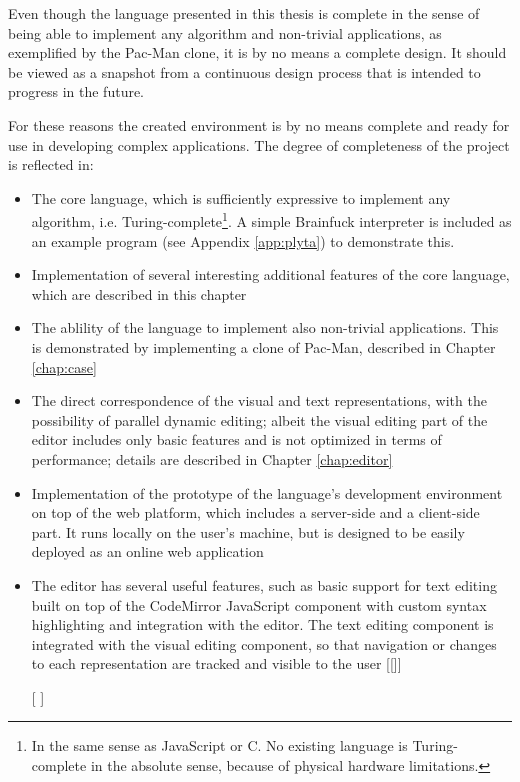 Even though the language presented in this thesis is complete in the sense of
being able to implement any algorithm and non-trivial applications, as
exemplified by the Pac-Man clone, it is by no means a complete design. It should
be viewed as a snapshot from a continuous design process that is intended to
progress in the future.

For these reasons the created environment is by no means complete and ready for
use in developing complex applications. The degree of completeness of the
project is reflected in:
\begin{itemize}
    \item The core language, which is sufficiently expressive to implement any
    algorithm, i.e. Turing-complete\footnote{In the same sense as JavaScript or C. No existing language is Turing-complete in the absolute sense, because of physical hardware limitations.}. A simple Brainfuck interpreter is included as an example program (see Appendix \ref{app:plyta}) to demonstrate this\cite{bf_turing_complete}.   
    \item Implementation of several interesting additional features of the core
    language, which are described in this chapter 
    \item The ablility of the language to implement also non-trivial
    applications. This is demonstrated by implementing a clone of Pac-Man,
    described in Chapter \ref{chap:case}
    \item The direct correspondence of the visual and text representations, with
    the possibility of parallel dynamic editing; albeit the visual editing
    part of the editor includes only basic features and is not optimized in
    terms of performance; details are described in Chapter \ref{chap:editor}
    \item Implementation of the prototype of the language's development
    environment on top of the web platform, which includes a server-side and a
    client-side part. It runs locally on the user's machine, but is designed
    to be easily deployed as an online web application
    \item The editor has several useful features, such as basic support for text
    editing built on top of the CodeMirror JavaScript component with custom
    syntax highlighting and integration with the editor. The text editing
    component is integrated with the visual editing component, so that
    navigation or changes to each representation are tracked and visible to
    the user [[]]
    \item [[]]
\end{itemize}